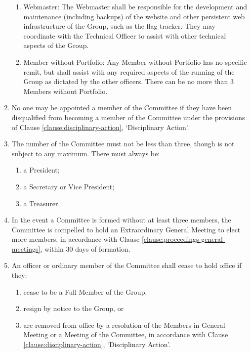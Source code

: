 \documentclass[12pt]{constitution}
\begin{document}
\begin{enumerate}
\begin{enumerate}
        \item Webmaster: The Webmaster shall be responsible for the development and maintenance (including backups) of the website and other persistent web infrastructure of the Group, such as the flag tracker. They may coordinate with the Technical Officer to assist with other technical aspects of the Group.
        \item Member without Portfolio: Any Member without Portfolio has no specific remit, but shall assist with any required aspects of the running of the Group as dictated by the other officers. There can be no more than 3 Members without Portfolio.
    \end{enumerate}
    \item No one may be appointed a member of the Committee if they have been disqualified from becoming a member of the Committee under the provisions of Clause \ref{clause:disciplinary-action}, `Disciplinary Action'.
    \item The number of the Committee must not be less than three, though is not subject to any maximum. There must always be:
    \begin{enumerate}
        \item a President;
        \item a Secretary or Vice President;
        \item a Treasurer.
    \end{enumerate}
    \item In the event a Committee is formed without at least three members, the Committee is compelled to hold an Extraordinary General Meeting to elect more members, in accordance with Clause \ref{clause:proceedings-general-meetings}, within 30 days of formation.

    \item An officer or ordinary member of the Committee shall cease to hold office if they:
    \begin{enumerate}
        \item cease to be a Full Member of the Group.
        \item resign by notice to the Group, or
        \item are removed from office by a resolution of the Members in General Meeting or a Meeting of the Committee, in accordance with Clause \ref{clause:disciplinary-action}, `Disciplinary Action'.
    \end{enumerate}
\end{enumerate}

\end{document}
